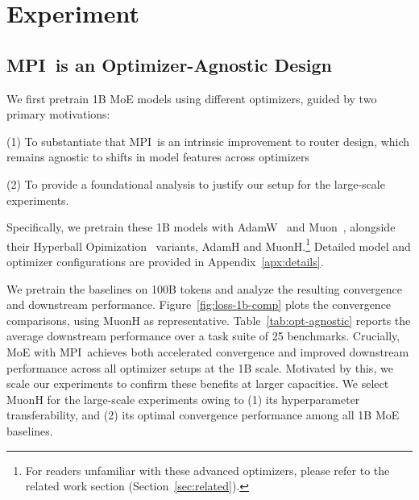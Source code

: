 \documentclass{llmxive}
\providecommand{\name}{MPI}
\begin{document}
\section{Experiment}
\subsection{\name\ is an Optimizer-Agnostic Design}
We first pretrain 1B MoE models using different optimizers, guided by two primary motivations:

(1) To substantiate that \name\ is an intrinsic improvement to router design, which remains agnostic to shifts in model features across optimizers

(2) To provide a foundational analysis to justify our setup for the large-scale experiments.

Specifically, we pretrain these 1B models with AdamW~\cite{adamw} and Muon~\cite{muon}, alongside their Hyperball Opimization~\cite{hyperball} variants, AdamH and MuonH.\footnote{For readers unfamiliar with these advanced optimizers, please refer to the related work section (Section~\ref{sec:related}).}
Detailed model and optimizer configurations are provided in Appendix~\ref{apx:details}.


We pretrain the baselines on 100B tokens and analyze the resulting convergence and downstream performance.
Figure~\ref{fig:loss-1b-comp} plots the convergence comparisons, using MuonH as representative.
Table~\ref{tab:opt-agnostic} reports the average downstream performance over a task suite of 25 benchmarks.
Crucially, MoE with \name\ achieves both accelerated convergence and improved downstream performance across all optimizer setups at the 1B scale. 
Motivated by this, we scale our experiments to confirm these benefits at larger capacities. 
We select MuonH for the large-scale experiments owing to 
(1) its  hyperparameter transferability, 
and (2) its optimal convergence performance among all 1B MoE baselines.
\end{document}
